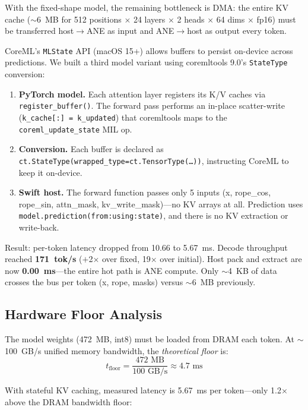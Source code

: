 \documentclass[11pt,twocolumn]{article}
\begin{document}
With the fixed-shape model, the remaining bottleneck is DMA: the
entire KV cache ($\sim$6~MB for 512 positions $\times$ 24 layers
$\times$ 2 heads $\times$ 64 dims $\times$ fp16) must be transferred
host$\to$ANE as input and ANE$\to$host as output every token.

CoreML's \texttt{MLState} API (macOS 15+) allows buffers to persist
on-device across predictions.  We built a third model variant using
coremltools 9.0's \texttt{StateType} conversion:

\begin{enumerate}
\item \textbf{PyTorch model.}  Each attention layer registers its K/V
  caches via \texttt{register\_buffer()}.  The forward pass performs an
  in-place scatter-write (\texttt{k\_cache[:] = k\_updated}) that
  coremltools maps to the \texttt{coreml\_update\_state} MIL op.
\item \textbf{Conversion.}  Each buffer is declared as
  \texttt{ct.StateType(wrapped\_type=ct.TensorType(\ldots))},
  instructing CoreML to keep it on-device.
\item \textbf{Swift host.}  The forward function passes only 5 inputs
  (x, rope\_cos, rope\_sin, attn\_mask, kv\_write\_mask)---no KV
  arrays at all.  Prediction uses
  \texttt{model.prediction(from:using:state)}, and there is no KV
  extraction or write-back.
\end{enumerate}

Result: per-token latency dropped from 10.66 to 5.67~ms.  Decode
throughput reached \textbf{171~tok/s} ($+$2$\times$ over fixed,
19$\times$ over initial).  Host pack and extract are now
\textbf{0.00~ms}---the entire hot path is ANE compute.  Only
$\sim$4~KB of data crosses the bus per token (x, rope, masks) versus
$\sim$6~MB previously.

\subsection{Hardware Floor Analysis}

The model weights (472~MB, int8) must be loaded from DRAM each token.
At $\sim$100~GB/s unified memory bandwidth, the \emph{theoretical
floor} is:
\begin{equation}
t_\text{floor} = \frac{472 \text{ MB}}{100 \text{ GB/s}} \approx 4.7 \text{ ms}
\end{equation}

With stateful KV caching, measured latency is 5.67~ms per token---only
1.2$\times$ above the DRAM bandwidth floor:
\end{document}
